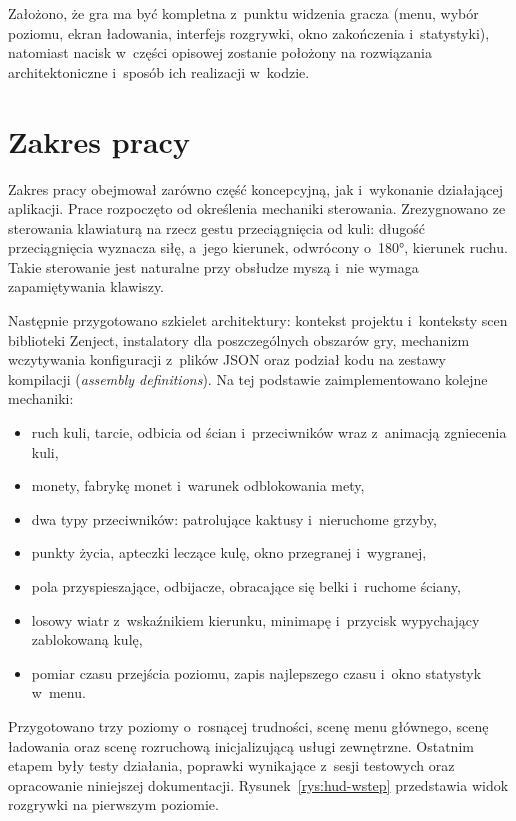 Założono, że gra ma być kompletna z~punktu widzenia gracza (menu, wybór poziomu, ekran
ładowania, interfejs rozgrywki, okno zakończenia i~statystyki), natomiast nacisk w~części
opisowej zostanie położony na rozwiązania architektoniczne i~sposób ich realizacji w~kodzie.

\section{Zakres pracy}

Zakres pracy obejmował zarówno część koncepcyjną, jak i~wykonanie działającej aplikacji.
Prace rozpoczęto od określenia mechaniki sterowania. Zrezygnowano ze sterowania klawiaturą
na rzecz gestu przeciągnięcia od kuli: długość przeciągnięcia wyznacza siłę, a~jego
kierunek, odwrócony o~180°, kierunek ruchu. Takie sterowanie jest naturalne przy obsłudze
myszą i~nie wymaga zapamiętywania klawiszy.

Następnie przygotowano szkielet architektury: kontekst projektu i~konteksty scen biblioteki
Zenject, instalatory dla poszczególnych obszarów gry, mechanizm wczytywania konfiguracji
z~plików JSON oraz podział kodu na zestawy kompilacji (\emph{assembly definitions}).
Na tej podstawie zaimplementowano kolejne mechaniki:
\begin{itemize}[leftmargin=1.9cm, itemsep=1pt]
  \item ruch kuli, tarcie, odbicia od ścian i~przeciwników wraz z~animacją zgniecenia kuli,
  \item monety, fabrykę monet i~warunek odblokowania mety,
  \item dwa typy przeciwników: patrolujące kaktusy i~nieruchome grzyby,
  \item punkty życia, apteczki leczące kulę, okno przegranej i~wygranej,
  \item pola przyspieszające, odbijacze, obracające się belki i~ruchome ściany,
  \item losowy wiatr z~wskaźnikiem kierunku, minimapę i~przycisk wypychający zablokowaną kulę,
  \item pomiar czasu przejścia poziomu, zapis najlepszego czasu i~okno statystyk w~menu.
\end{itemize}

Przygotowano trzy poziomy o~rosnącej trudności, scenę menu głównego, scenę ładowania oraz
scenę rozruchową inicjalizującą usługi zewnętrzne. Ostatnim etapem były testy
działania, poprawki wynikające z~sesji testowych oraz opracowanie niniejszej dokumentacji. Rysunek~\ref{rys:hud-wstep} przedstawia widok rozgrywki na pierwszym poziomie.

